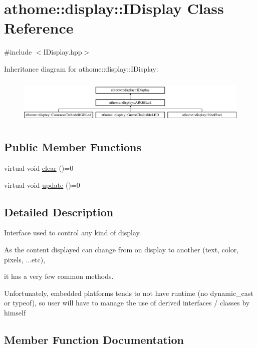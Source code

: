 \hypertarget{classathome_1_1display_1_1_i_display}{}\section{athome\+:\+:display\+:\+:I\+Display Class Reference}
\label{classathome_1_1display_1_1_i_display}


{\ttfamily \#include $<$I\+Display.\+hpp$>$}

Inheritance diagram for athome\+:\+:display\+:\+:I\+Display\+:\begin{figure}[H]
\begin{center}
\leavevmode
\includegraphics[height=2.213439cm]{classathome_1_1display_1_1_i_display}
\end{center}
\end{figure}
\subsection*{Public Member Functions}
\begin{DoxyCompactItemize}
\item 
virtual void \mbox{\hyperlink{classathome_1_1display_1_1_i_display_a0d3add1ce61c96657827fb56d250d9c6}{clear}} ()=0
\item 
virtual void \mbox{\hyperlink{classathome_1_1display_1_1_i_display_a4ba7bd5d46f88578f1c846f4f5f3c5d1}{update}} ()=0
\end{DoxyCompactItemize}


\subsection{Detailed Description}
Interface used to control any kind of display.

As the content displayed can change from on display to another (text, color, pixels, ...etc),

it has a very few common methods.

Unfortunately, embedded platforms tends to not have runtime (no {\ttfamily dynamic\+\_\+cast} or {\ttfamily typeof}), so user will have to manage the use of derived interfaces / classes by himself 

\subsection{Member Function Documentation}
\mbox{\label{classathome_1_1display_1_1_i_display_a0d3add1ce61c96657827fb56d250d9c6}} 

